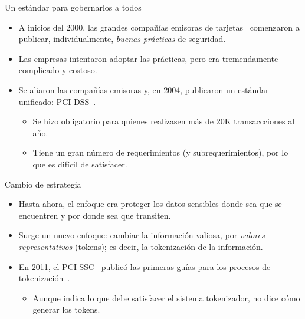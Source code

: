 \begin{frame}{Un estándar para gobernarlos a todos}
  \begin{itemize}
    \item A inicios del 2000, las grandes compañías emisoras de
      tarjetas~\footnotemark{} comenzaron a publicar, individualmente,
      \textit{buenas prácticas} de seguridad.
    \item Las empresas intentaron adoptar las prácticas, pero era tremendamente
      complicado y costoso.
    \item Se aliaron las compañías emisoras y, en 2004, publicaron un estándar
      unificado: PCI-DSS\footnotemark~\cite{pci_dss}.
      \begin{itemize}
        \item Se hizo obligatorio para quienes realizasen más de 20K
          transaccciones al año.
        \item Tiene un gran número de requerimientos (y subrequerimientos), por
          lo que es difícil de satisfacer.
      \end{itemize}
  \end{itemize}


\end{frame}

\begin{frame}{Cambio de estrategia}
  \begin{itemize}
    \item Hasta ahora, el enfoque era proteger los datos sensibles donde sea
      que se encuentren y por donde sea que transiten.
    \item Surge un nuevo enfoque: cambiar la información valiosa, por
      \textit{valores representativos} (tokens); es decir, la tokenización
      de la información.
    \item En 2011, el PCI-SSC~\footnotemark{} publicó las primeras guías para los
      procesos de tokenización~\cite{pci_tokens}.
      \begin{itemize}
        \item Aunque indica lo que debe satisfacer el sistema tokenizador,
          no dice cómo generar los tokens.
      \end{itemize}
  \end{itemize}
\end{frame}

